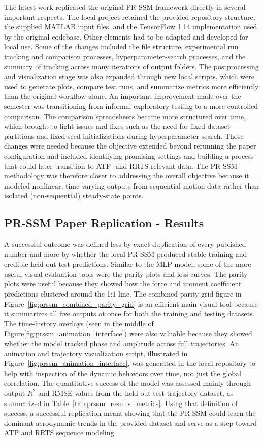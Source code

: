 The latest work replicated the original PR-SSM framework directly in several important respects. The local project retained the provided repository structure, the supplied MATLAB input files, and the TensorFlow 1.14 implementation used by the original codebase. Other elements had to be adapted and developed for local use. Some of the changes included the file structure, experimental run tracking and comparison processes, hyperparameter-search processes, and the summary of tracking across many iterations of output folders. The postprocessing and visualization stage was also expanded through new local scripts, which were used to generate plots, compare test runs, and summarize metrics more efficiently than the original workflow alone. An important improvement made over the semester was transitioning from informal exploratory testing to a more controlled comparison. The comparison spreadsheets became more structured over time, which brought to light issues and fixes such as the need for fixed dataset partitions and fixed seed initializations during hyperparameter search. Those changes were needed because the objective extended beyond rerunning the paper configuration and included identifying promising settings and building a process that could later transition to ATP- and RRTS-relevant data. The PR-SSM methodology was therefore closer to addressing the overall objective because it modeled nonlinear, time-varying outputs from sequential motion data rather than isolated (non-sequential) steady-state points.

\subsection{PR-SSM Paper Replication - Results}
A successful outcome was defined less by exact duplication of every published number and more by whether the local PR-SSM produced stable training and credible held-out test predictions. Similar to the MLP model, some of the more useful visual evaluation tools were the parity plots and loss curves. The parity plots were useful because they showed how the force and moment coefficient predictions clustered around the 1:1 line. The combined parity-grid figure in Figure~\ref{fig:prssm_combined_parity_grid} is an efficient main visual tool because it summarizes all five outputs at once for both the training and testing datasets. The time-history overlays (seen in the middle of Figure\ref{fig:prssm_animation_interface}) were also valuable because they showed whether the model tracked phase and amplitude across full trajectories. An animation and trajectory visualization script, illustrated in Figure~\ref{fig:prssm_animation_interface}, was generated in the local repository to help with inspection of the dynamic behaviors over time, not just the global correlation. The quantitative success of the model was assessed mainly through output $R^2$ and RMSE values from the held-out test trajectory dataset, as summarized in Table~\ref{tab:prssm_results_metrics}. Using that definition of success, a successful replication meant showing that the PR-SSM could learn the dominant aerodynamic trends in the provided dataset and serve as a step toward ATP and RRTS sequence modeling.

